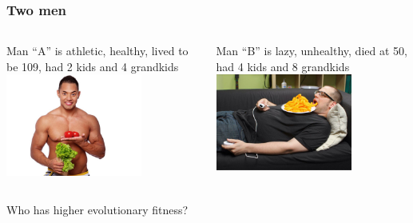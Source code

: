 \documentclass[10pt]{beamer}
\begin{document}
\begin{frame}[t]
\frametitle{Two men}
\vspace{0.25cm}

	\begin{columns}[t]
		\begin{column}{0.5\textwidth}
			\begin{center}
				Man ``A'' is athletic, healthy, lived to be 109, had 2 kids and 4 grandkids\\
				\vspace{0.5cm}
				\includegraphics[width=0.7\textwidth]{figures/healthy.jpg}
			\end{center}
		\end{column}
		
		\begin{column}{0.5\textwidth}
			\begin{center}
				Man ``B'' is lazy, unhealthy, died at 50, had 4 kids and 8 grandkids\\
				\vspace{0.5cm}
				\includegraphics[width=0.7\textwidth]{figures/lazy.jpg}
			\end{center}
		\end{column}
	\end{columns}
	
	\vspace{0.5cm}
	
	\begin{center}
		\textcolor{myblue}{Who has higher evolutionary fitness?}
	\end{center}
\end{frame}
\end{document}
